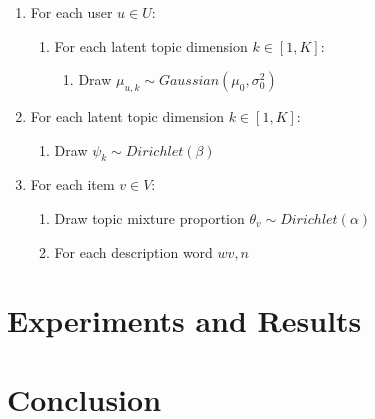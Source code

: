 \documentclass[10pt,conference]{IEEEtran}
\begin{document}
\begin{enumerate}

	\item For each user $u \in U$:
		\medskip
		\begin{enumerate}
			\item For each latent topic dimension $k \in [1, K]$:
				\smallskip
				\begin{enumerate}
					\item Draw $\mu_{u,k} \sim Gaussian(\mu_0, \sigma^2_0)$
				\end{enumerate}
		\end{enumerate}
	\item For each latent topic dimension $k \in [1, K]:$
		\medskip
		\begin{enumerate}
			\item Draw $\psi_k \sim Dirichlet(\beta)$
			\smallskip 
		\end{enumerate}
	\item For each item $v \in V$:
		\medskip
		\begin{enumerate}
			\item Draw topic mixture proportion $\theta_v \sim Dirichlet(\alpha)$
			\item For each description word $w{v,n}$
		\end{enumerate}


\end{enumerate}

\section{Experiments and Results}

\section{Conclusion}

\newpage



\end{document}
